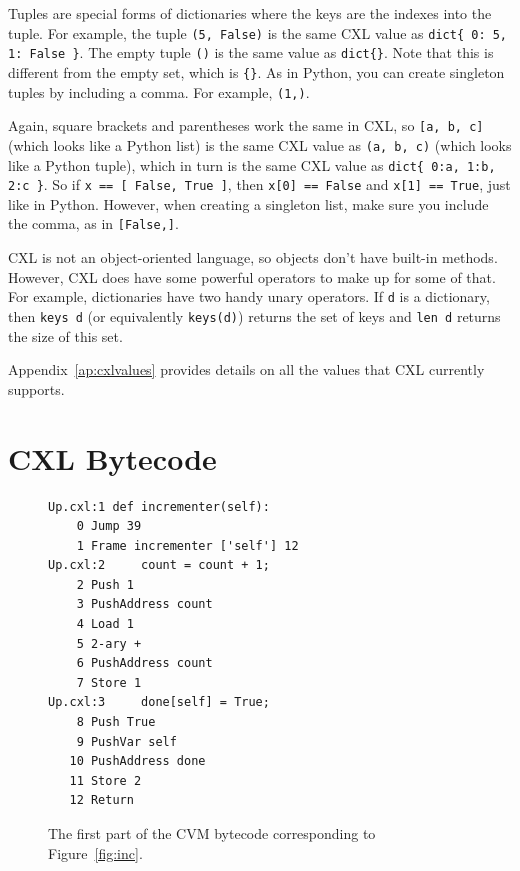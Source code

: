 \documentclass{report}
\newenvironment{code}{
\tcolorbox
}{
\endtcolorbox
}
\begin{document}
Tuples are special forms of dictionaries where the keys are
the indexes into the tuple.  For example, the tuple
\texttt{(5, False)} is the same CXL value as
\texttt{dict\{ 0: 5, 1: False \}}.
The empty tuple \texttt{()} is the same value as \texttt{dict\{\}}.
Note that this is different from the empty set, which is \texttt{\{\}}.
As in Python, you can create singleton tuples by including a comma.
For example, \texttt{(1,)}.

Again, square brackets and parentheses work the same in CXL, so
\texttt{[a, b, c]} (which looks like a Python list)
is the same CXL value as \texttt{(a, b, c)} (which looks like a Python tuple),
which in turn is the same CXL value as \texttt{dict\{ 0:a, 1:b, 2:c \}}.
So if \texttt{x == [ False, True ]},
then \texttt{x[0] == False} and \texttt{x[1] == True}, just like in Python.
However, when creating a singleton list, make sure you include the
comma, as in \texttt{[False,]}.

CXL is not an object-oriented language, so objects don't have
built-in methods.  However, CXL does have some powerful operators to
make up for some of that.
For example, dictionaries have two handy unary operators.
If \texttt{d} is a
dictionary, then \texttt{keys~d} (or equivalently \texttt{keys(d)})
returns the set of keys and \texttt{len~d} returns the size of
this set.

Appendix~\ref{ap:cxlvalues} provides details on all the values that
CXL currently supports.

\section*{CXL Bytecode}

\begin{figure}
\begin{code}
\begin{verbatim}
Up.cxl:1 def incrementer(self):
    0 Jump 39
    1 Frame incrementer ['self'] 12
Up.cxl:2     count = count + 1;
    2 Push 1
    3 PushAddress count
    4 Load 1
    5 2-ary +
    6 PushAddress count
    7 Store 1
Up.cxl:3     done[self] = True;
    8 Push True
    9 PushVar self
   10 PushAddress done
   11 Store 2
   12 Return
\end{verbatim}
\end{code}
\caption{The first part of the CVM bytecode corresponding to Figure~\ref{fig:inc}.}
\label{fig:inccode}
\end{figure}
\end{document}
